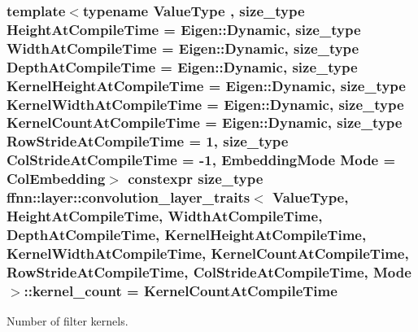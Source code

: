 \hypertarget{structffnn_1_1layer_1_1convolution__layer__traits_a4cdb0a6a0f47662f59f77beff2b406e5}{
\subsubsection[{kernel\-\_\-count}]{\setlength{\rightskip}{0pt plus 5cm}template$<$typename Value\-Type , size\-\_\-type Height\-At\-Compile\-Time = Eigen\-::\-Dynamic, size\-\_\-type Width\-At\-Compile\-Time = Eigen\-::\-Dynamic, size\-\_\-type Depth\-At\-Compile\-Time = Eigen\-::\-Dynamic, size\-\_\-type Kernel\-Height\-At\-Compile\-Time = Eigen\-::\-Dynamic, size\-\_\-type Kernel\-Width\-At\-Compile\-Time = Eigen\-::\-Dynamic, size\-\_\-type Kernel\-Count\-At\-Compile\-Time = Eigen\-::\-Dynamic, size\-\_\-type Row\-Stride\-At\-Compile\-Time = 1, size\-\_\-type Col\-Stride\-At\-Compile\-Time = -\/1, Embedding\-Mode Mode = Col\-Embedding$>$ constexpr {\bf size\-\_\-type} {\bf ffnn\-::layer\-::convolution\-\_\-layer\-\_\-traits}$<$ Value\-Type, Height\-At\-Compile\-Time, Width\-At\-Compile\-Time, Depth\-At\-Compile\-Time, Kernel\-Height\-At\-Compile\-Time, Kernel\-Width\-At\-Compile\-Time, Kernel\-Count\-At\-Compile\-Time, Row\-Stride\-At\-Compile\-Time, Col\-Stride\-At\-Compile\-Time, Mode $>$\-::kernel\-\_\-count = Kernel\-Count\-At\-Compile\-Time\hspace{0.3cm}{\ttfamily [static]}}}\label{structffnn_1_1layer_1_1convolution__layer__traits_a4cdb0a6a0f47662f59f77beff2b406e5}


Number of filter kernels. 

